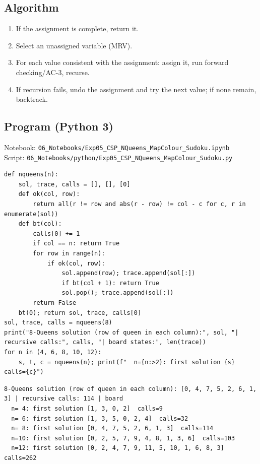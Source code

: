 \documentclass[11pt]{article}
\begin{document}
\subsection*{Algorithm}
\begin{algo}[Procedure]\begin{enumerate}
\item If the assignment is complete, return it.
\item Select an unassigned variable (MRV).
\item For each value consistent with the assignment: assign it, run forward checking/AC-3, recurse.
\item If recursion fails, undo the assignment and try the next value; if none remain, backtrack.
\end{enumerate}\end{algo}
\subsection*{Program (Python 3)}
{\small\color{slate}Notebook: \texttt{06\_Notebooks/Exp05\_CSP\_NQueens\_MapColour\_Sudoku.ipynb}\\ Script: \texttt{06\_Notebooks/python/Exp05\_CSP\_NQueens\_MapColour\_Sudoku.py}}
\begin{lstlisting}[style=py]
def nqueens(n):
    sol, trace, calls = [], [], [0]
    def ok(col, row):
        return all(r != row and abs(r - row) != col - c for c, r in enumerate(sol))
    def bt(col):
        calls[0] += 1
        if col == n: return True
        for row in range(n):
            if ok(col, row):
                sol.append(row); trace.append(sol[:])
                if bt(col + 1): return True
                sol.pop(); trace.append(sol[:])
        return False
    bt(0); return sol, trace, calls[0]
sol, trace, calls = nqueens(8)
print("8-Queens solution (row of queen in each column):", sol, "| recursive calls:", calls, "| board states:", len(trace))
for n in (4, 6, 8, 10, 12):
    s, t, c = nqueens(n); print(f"  n={n:>2}: first solution {s}  calls={c}")
\end{lstlisting}
\begin{lstlisting}[style=out]
8-Queens solution (row of queen in each column): [0, 4, 7, 5, 2, 6, 1, 3] | recursive calls: 114 | board 
  n= 4: first solution [1, 3, 0, 2]  calls=9
  n= 6: first solution [1, 3, 5, 0, 2, 4]  calls=32
  n= 8: first solution [0, 4, 7, 5, 2, 6, 1, 3]  calls=114
  n=10: first solution [0, 2, 5, 7, 9, 4, 8, 1, 3, 6]  calls=103
  n=12: first solution [0, 2, 4, 7, 9, 11, 5, 10, 1, 6, 8, 3]  calls=262
\end{lstlisting}
\end{document}
